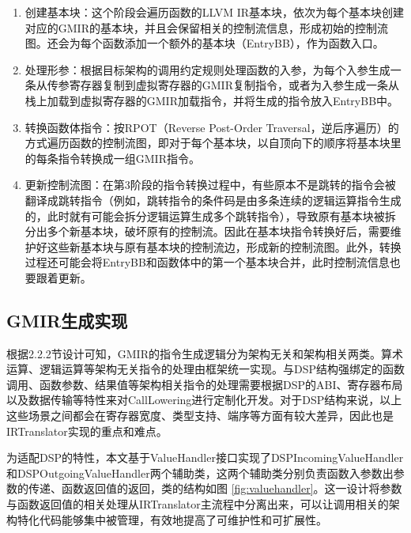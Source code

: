 \begin{enumerate}
	\item
	创建基本块：这个阶段会遍历函数的LLVM IR基本块，依次为每个基本块创建对应的GMIR的基本块，并且会保留相关的控制流信息，形成初始的控制流图。还会为每个函数添加一个额外的基本块（EntryBB），作为函数入口。
	
	\item
	处理形参：根据目标架构的调用约定规则处理函数的入参，为每个入参生成一条从传参寄存器复制到虚拟寄存器的GMIR复制指令，或者为入参生成一条从栈上加载到虚拟寄存器的GMIR加载指令，并将生成的指令放入EntryBB中。
	
	\item 
	转换函数体指令：按RPOT（Reverse Post-Order Traversal，逆后序遍历）的方式遍历函数的控制流图，即对于每个基本块，以自顶向下的顺序将基本块里的每条指令转换成一组GMIR指令。
	
	\item 
	更新控制流图：在第3阶段的指令转换过程中，有些原本不是跳转的指令会被翻译成跳转指令（例如，跳转指令的条件码是由多条连续的逻辑运算指令生成的，此时就有可能会拆分逻辑运算生成多个跳转指令），导致原有基本块被拆分出多个新基本块，破坏原有的控制流。因此在基本块指令转换好后，需要维护好这些新基本块与原有基本块的控制流边，形成新的控制流图。此外，转换过程还可能会将EntryBB和函数体中的第一个基本块合并，此时控制流信息也要跟着更新。
	
\end{enumerate}


\subsection{GMIR生成实现}
根据2.2.2节设计可知，GMIR的指令生成逻辑分为架构无关和架构相关两类。算术运算、逻辑运算等架构无关指令的处理由框架统一实现。与DSP结构强绑定的函数调用、函数参数、结果值等架构相关指令的处理需要根据DSP的ABI、寄存器布局以及数据传输等特性来对CallLowering进行定制化开发。对于DSP结构来说，以上这些场景之间都会在寄存器宽度、类型支持、端序等方面有较大差异，因此也是IRTranslator实现的重点和难点。

\par

为适配DSP的特性，本文基于ValueHandler接口实现了DSPIncomingValueHandler和DSPOutgoingValueHandler两个辅助类，这两个辅助类分别负责函数入参数出参数的传递、函数返回值的返回，类的结构如图 \ref{fig:valuehandler}。这一设计将参数与函数返回值的相关处理从IRTranslator主流程中分离出来，可以让调用相关的架构特化代码能够集中被管理，有效地提高了可维护性和可扩展性。

